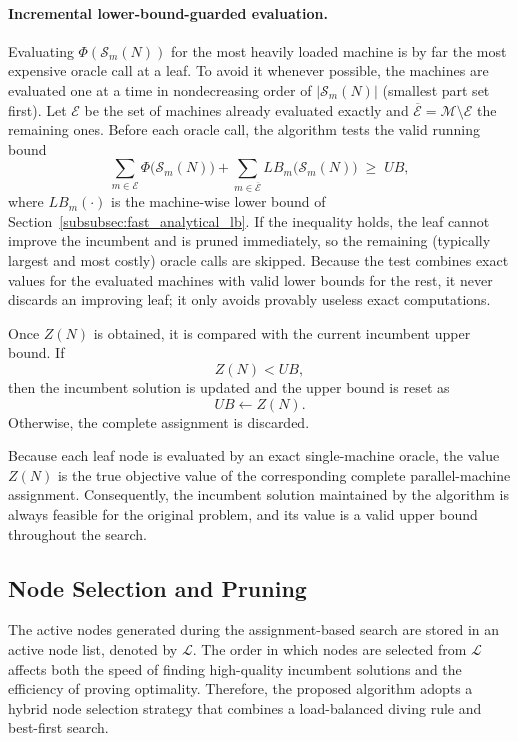 \documentclass[letterpaper, 10 pt, conference]{ieeeconf}  %
\begin{document}
\paragraph*{Incremental lower-bound-guarded evaluation.}
Evaluating $\Phi(\mathcal{S}_m(N))$ for the most heavily loaded machine is by
far the most expensive oracle call at a leaf. To avoid it whenever possible,
the machines are evaluated one at a time in nondecreasing order of
$|\mathcal{S}_m(N)|$ (smallest part set first). Let $\mathcal{E}$ be the set of
machines already evaluated exactly and
$\overline{\mathcal{E}}=\mathcal{M}\setminus\mathcal{E}$ the remaining ones.
Before each oracle call, the algorithm tests the valid running bound
\[
\sum_{m\in\mathcal{E}}\Phi\bigl(\mathcal{S}_m(N)\bigr)
+\sum_{m\in\overline{\mathcal{E}}}LB_m\bigl(\mathcal{S}_m(N)\bigr)\;\ge\;UB,
\]
where $LB_m(\cdot)$ is the machine-wise lower bound of
Section~\ref{subsubsec:fast_analytical_lb}. If the inequality holds, the leaf
cannot improve the incumbent and is pruned immediately, so the remaining
(typically largest and most costly) oracle calls are skipped. Because the test
combines exact values for the evaluated machines with valid lower bounds for
the rest, it never discards an improving leaf; it only avoids provably useless
exact computations.

Once $Z(N)$ is obtained, it is compared with the current incumbent upper
bound. If
\[
Z(N)<UB,
\]
then the incumbent solution is updated and the upper bound is reset as
\[
UB\leftarrow Z(N).
\]
Otherwise, the complete assignment is discarded.

Because each leaf node is evaluated by an exact single-machine oracle, the
value $Z(N)$ is the true objective value of the corresponding complete
parallel-machine assignment. Consequently, the incumbent solution maintained
by the algorithm is always feasible for the original problem, and its value
is a valid upper bound throughout the search.

\subsection{Node Selection and Pruning}
\label{subsec:node_selection_pruning}

The active nodes generated during the assignment-based search are stored in
an active node list, denoted by $\mathcal{L}$. The order in which nodes are
selected from $\mathcal{L}$ affects both the speed of finding high-quality
incumbent solutions and the efficiency of proving optimality. Therefore,
the proposed algorithm adopts a hybrid node selection strategy that combines
a load-balanced diving rule and best-first search.
\end{document}
